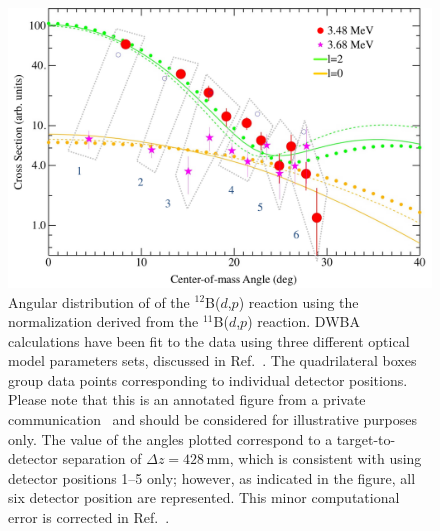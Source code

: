 \begin{figure}[p]
\centering
\includegraphics[height=0.4\textheight,width=\columnwidth,keepaspectratio]{More_Figures/b13}%
\caption[Angular distribution of of the $^{12}$B($d$,$p$) reaction]{Angular distribution of of the $^{12}$B($d$,$p$) reaction using the normalization derived from the $^{11}$B($d$,$p$) reaction.  DWBA calculations have been fit to the data using three different optical model parameters sets, discussed in Ref.~\cite{Schiffer_2010}. The quadrilateral boxes group data points corresponding to individual detector positions.  Please note that this is an annotated figure from a private communication~\cite{Schiffer_2009PC} and should be considered for illustrative purposes only.  The value of the angles plotted correspond to a target-to-detector separation of $\Delta z = 428$\,mm, which is consistent with using detector positions 1--5 only; however, as indicated in the figure, all six detector position are represented. This minor computational error is corrected in Ref.~\cite{Schiffer_2010}.
}%
\label{b13angdist}%
\end{figure}
